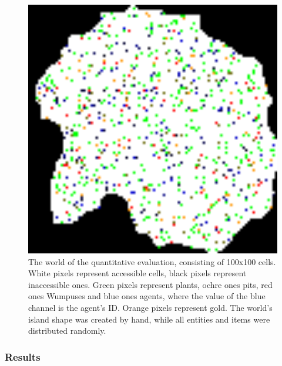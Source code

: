 \begin{figure}
	\centering
	\includegraphics[width=400pt]{Figs/evalWorldQuant.png}
	\caption{The world of the quantitative evaluation, consisting of 100x100 cells. White pixels represent accessible cells, black pixels represent inaccessible ones. Green pixels represent plants, ochre ones pits, red ones Wumpuses and blue ones agents, where the value of the blue channel is the agent's ID. Orange pixels represent gold. The world's island shape was created by hand, while all entities and items were distributed randomly.}
	\label{fig:evalWorldQuant}
\end{figure}

\subsubsection{Results}

